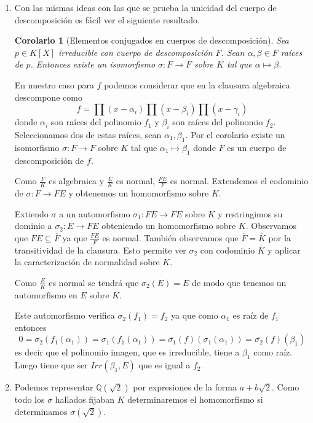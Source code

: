 \documentclass{article}
\theoremstyle{theorem-style}  %
\newtheorem{corollary}[theorem]{Corolario} %
\theoremstyle{definition-style}
\theoremstyle{example-style}
\begin{document}
\begin{enumerate}
\item Con las mismas ideas con las que se prueba la unicidad del cuerpo de descomposición es fácil ver el siguiente resultado. 

\begin{corollary}[Elementos conjugados en cuerpos de descomposición]
Sea $p \in K[X]$ irreducible con cuerpo de descomposición $F$. Sean $\alpha,\beta \in F$ raíces de $p$. Entonces existe un isomorfismo $\sigma:F \to F$ sobre $K$ tal que $\alpha \mapsto \beta$. 
\end{corollary}

En nuestro caso para $f$ podemos considerar que en la clausura algebraica descompone como $$f = \prod (x - \alpha_i) \prod (x - \beta_i) \prod (x - \gamma_i)$$ donde $\alpha_i$ son raíces del polinomio $f_1$ y $\beta_i$ son raíces del polinomio $f_2$. Seleccionamos dos de estas raíces, sean $\alpha_1, \beta_1$. Por el corolario existe un isomorfismo $\sigma:F \to F$ sobre $K$ tal que $\alpha_1 \mapsto \beta_1$ donde $F$ es un cuerpo de descomposición de $f$. 

Como $\frac{F}{K}$ es algebraica y $\frac{E}{K}$ es normal, $\frac{FE}{F}$ es normal. Extendemos el codominio de $\sigma:F \to FE$ y obtenemos un homomorfismo sobre $K$.

Extiendo $\sigma$ a un automorfismo $\sigma_1:FE \to FE$ sobre $K$ y restringimos su dominio a $\sigma_2:E \to FE$ obteniendo un homomorfismo sobre $K$. Observamos que $FE \subseteq \overline{F}$ ya que $\frac{FE}{F}$ es normal. También observamos que $\overline{F} = \overline{K}$ por la transitividad de la clausura. Esto permite ver $\sigma_2$ con codominio $\overline{K}$ y aplicar la caracterización de normalidad sobre $K$. 

Como $\frac{E}{K}$ es normal se tendrá que $\sigma_2(E) = E$ de modo que tenemos un automorfismo en $E$ sobre $K$. 

Este automorfismo verifica $\sigma_2(f_1) = f_2$ ya que como $\alpha_1$ es raíz de $f_1$ entonces $$0 = \sigma_2(f_1(\alpha_1)) = \sigma_1(f_1(\alpha_1)) = \overline{\sigma_1}(f)(\sigma_1(\alpha_1)) = \overline{\sigma_2}(f)(\beta_1)$$ es decir que el polinomio imagen, que es irreducible, tiene a $\beta_1$ como raíz. Luego tiene que ser $Irr(\beta_1,E)$ que es igual a $f_2$. 

\item Podemos representar $\mathbb{Q}(\sqrt{2})$ por expresiones de la forma $a + b \sqrt{2}$. Como todo los $\sigma$ hallados fijaban $K$ determinaremos el homomorfismo si determinamos $\sigma(\sqrt{2})$.


\end{enumerate}
\end{document}

